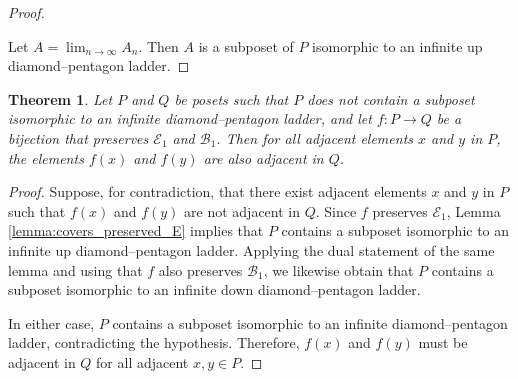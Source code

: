 \documentclass{article}[12pt]
\theoremstyle{exampstyle}
\newtheorem{theorem}{Theorem}[section]
\theoremstyle{remark}
\newcommand{\B}{\mathcal{B}}
\newcommand{\E}{\mathcal{E}}
\begin{document}
\begin{proof}
\begin{center}
    \end{center}

    Let $A = \lim_{n \to \infty} A_n$.  Then $A$ is a subposet of $P$ isomorphic to an infinite up diamond–pentagon ladder.
\end{proof}

\begin{theorem}
    Let $P$ and $Q$ be posets such that $P$ does not contain a subposet isomorphic to an infinite diamond–pentagon ladder, and let $f: P \to Q$ be a bijection that preserves $\E_1$ and $\B_1$. Then for all adjacent elements $x$ and $y$ in $P$, the elements $f(x)$ and $f(y)$ are also adjacent in $Q$.
    \label{th:covers_preserved}
\end{theorem}
\begin{proof}
    Suppose, for contradiction, that there exist adjacent elements $x$ and $y$ in $P$ such that  $f(x)$ and $f(y)$ are not adjacent in $Q$. Since $f$ preserves $\E_1$, Lemma \ref{lemma:covers_preserved_E} implies that $P$ contains a subposet isomorphic to an infinite up diamond–pentagon ladder. Applying the dual statement of the same lemma and using that $f$ also preserves $\B_1$, we likewise obtain that $P$ contains a subposet isomorphic to an infinite down diamond–pentagon ladder.
    
    In either case, $P$ contains a subposet isomorphic to an infinite diamond–pentagon ladder, contradicting the hypothesis. Therefore, $f(x)$ and $f(y)$ must be adjacent in $Q$ for all adjacent $x,y \in P$.
\end{proof}
\end{document}
